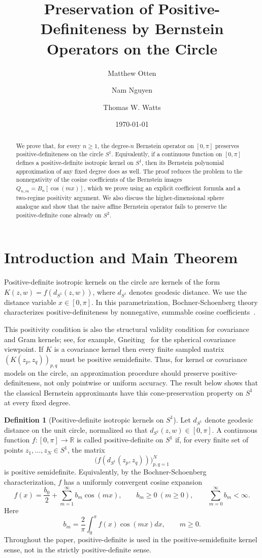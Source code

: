 \documentclass[a4paper,12pt]{amsart}
\title[Positive-Definiteness and Bernstein Operators]{Preservation of Positive-Definiteness by Bernstein Operators on the Circle}
\author{Matthew Otten}
\author{Nam Nguyen}
\author{Thomas W. Watts}
\date{\today}
\theoremstyle{definition}
\newtheorem{definition}[theorem]{Definition}
\theoremstyle{remark}
\begin{document}
\begin{abstract} 
We prove that, for every $n\ge1$, the degree-$n$ Bernstein operator on $[0,\pi]$ preserves positive-definiteness on the circle $S^1$. Equivalently, if a continuous function on $[0,\pi]$ defines a positive-definite isotropic kernel on $S^1$, then its Bernstein polynomial approximation of any fixed degree does as well. The proof reduces the problem to the nonnegativity of the cosine coefficients of the Bernstein images $ Q_{n,m}=B_n[\cos(mx)]$, which we prove using an explicit coefficient formula and a two-regime positivity argument. We also discuss the higher-dimensional sphere analogue and show that the naive affine Bernstein operator fails to preserve the positive-definite cone already on $S^2$.
\end{abstract} 

\maketitle

\section{Introduction and Main Theorem}
Positive-definite isotropic kernels on the circle are kernels of the form $K(z,w)=f(d_{S^1}(z,w))$, where $d_{S^1}$ denotes geodesic distance. We use the distance variable $x\in[0,\pi]$. In this parametrization, Bochner-Schoenberg theory characterizes positive-definiteness by nonnegative, summable cosine coefficients~\cite{Schoenberg1942PositiveDF,Bingham1973PositiveDF,Katznelson2004Harmonic}.

This positivity condition is also the structural validity condition for covariance and Gram kernels; see, for example, Gneiting~\cite{Gneiting2013Spheres} for the spherical covariance viewpoint. If $K$ is a covariance kernel then every finite sampled matrix $(K(z_p,z_q))_{p,q}$ must be positive semidefinite. Thus, for kernel or covariance models on the circle, an approximation procedure should preserve positive-definiteness, not only pointwise or uniform accuracy. The result below shows that the classical Bernstein approximants have this cone-preservation property on $S^1$ at every fixed degree.

\begin{definition}[Positive-definite isotropic kernels on $S^1$] 
\label{def:pd-circle}
Let $d_{S^1}$ denote geodesic distance on the unit circle, normalized so that $d_{S^1}(z,w)\in[0,\pi]$. A continuous function $f: [0,\pi] \to\mathbb R$ is called positive-definite on $S^1$ if, for every finite set of points $z_1,\ldots,z_N \in S^1$, the matrix 
\[ \bigl(f(d_{S^1}(z_p,z_q))\bigr)_{p,q=1}^N \] 
is positive semidefinite. Equivalently, by the Bochner-Schoenberg characterization, $f$ has a uniformly convergent cosine expansion 
\[ 
f(x) = 
\frac{b_0}{2} + \sum_{m=1}^{\infty} b_m\cos(mx), \qquad b_m\ge0 \ (m \geq 0), \qquad \sum_{m=0}^{\infty} b_m<\infty. 
\] 
Here 
\[ 
b_m=\frac{2}{\pi}\int_0^\pi f(x)\cos(mx) dx,\qquad m \ge 0. 
\] 
Throughout the paper, positive-definite is used in the positive-semidefinite kernel sense, not in the strictly positive-definite sense. 
\end{definition}
\end{document}
